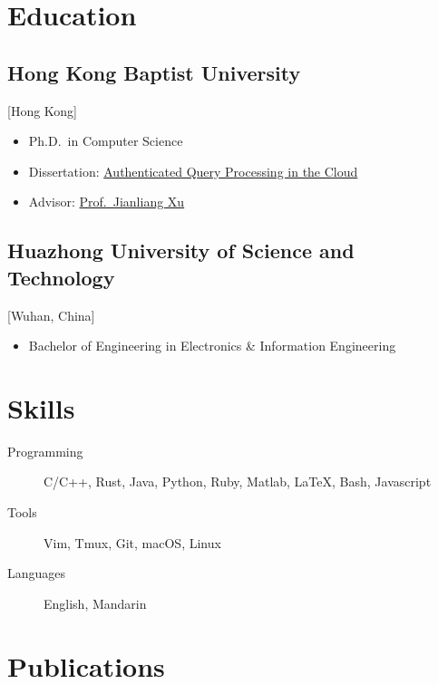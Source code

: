 \documentclass{mycv}
\begin{document}
\section{Education}

\subsection{Hong Kong Baptist University}[Hong Kong]
\vspace{-\parskip}%
\begin{itemize}[label={}]
  \item Ph.D.\ in Computer Science 
  \item Dissertation: \href{https://repository.hkbu.edu.hk/etd_oa/620}{Authenticated Query Processing in the Cloud}
  \item Advisor: \href{https://www.comp.hkbu.edu.hk/~xujl}{Prof.~Jianliang Xu}
\end{itemize}

\subsection{Huazhong University of Science and Technology}[Wuhan, China]
\vspace{-\parskip}%
\begin{itemize}[label={}]
  \item Bachelor of Engineering in Electronics \& Information Engineering 
\end{itemize}

\section{Skills}

\begin{description}
  \item[Programming] C/C++, Rust, Java, Python, Ruby, Matlab, \LaTeX, Bash, Javascript
  \item[Tools] Vim, Tmux, Git, macOS, Linux
  \item[Languages] English, Mandarin
\end{description}

\section{Publications}%

\end{document}
